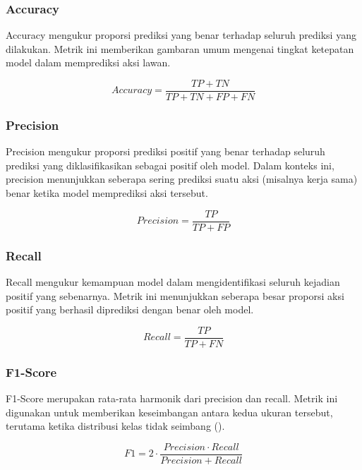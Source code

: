 \subsubsection{Accuracy}

Accuracy mengukur proporsi prediksi yang benar terhadap seluruh prediksi yang dilakukan. Metrik ini memberikan gambaran umum mengenai tingkat ketepatan model dalam memprediksi aksi lawan.

\begin{equation}
Accuracy = \frac{TP + TN}{TP + TN + FP + FN}
\end{equation}

\subsubsection{Precision}

Precision mengukur proporsi prediksi positif yang benar terhadap seluruh prediksi yang diklasifikasikan sebagai positif oleh model. Dalam konteks ini, precision menunjukkan seberapa sering prediksi suatu aksi (misalnya kerja sama) benar ketika model memprediksi aksi tersebut.

\begin{equation}
Precision = \frac{TP}{TP + FP}
\end{equation}

\subsubsection{Recall}

Recall mengukur kemampuan model dalam mengidentifikasi seluruh kejadian positif yang sebenarnya. Metrik ini menunjukkan seberapa besar proporsi aksi positif yang berhasil diprediksi dengan benar oleh model.

\begin{equation}
Recall = \frac{TP}{TP + FN}
\end{equation}

\subsubsection{F1-Score}

F1-Score merupakan rata-rata harmonik dari precision dan recall. Metrik ini digunakan untuk memberikan keseimbangan antara kedua ukuran tersebut, terutama ketika distribusi kelas tidak seimbang (\cite{sathyanarayanan_confusion_2024}).

\begin{equation}
F1 = 2 \cdot \frac{Precision \cdot Recall}{Precision + Recall}
\end{equation}


